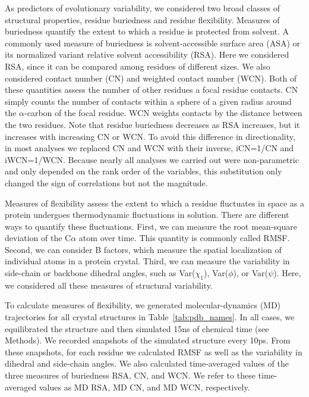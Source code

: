 \documentclass[12pt]{article}
\begin{document}
As predictors of evolutionary variability, we considered two broad classes of structural properties, residue buriedness and residue flexibility. Measures of buriedness quantify the extent to which a residue is protected from solvent. A commonly used measure of buriedness is solvent-accessible surface area (ASA) or its normalized variant relative solvent accessibility (RSA). Here we considered RSA, since it can be compared among residues of different sizes. We also considered contact number (CN) and weighted contact number (WCN). Both of these quantities assess the number of other residues a focal residue contacts. CN simply counts the number of contacts within a sphere of a given radius around the $\alpha$-carbon of the focal residue. WCN weights contacts by the distance between the two residues. Note that residue buriedness decreases as RSA increases, but it increases with increasing CN or WCN. To avoid this difference in directionality, in most analyses we replaced CN and WCN with their inverse, iCN=1/CN and iWCN=1/WCN. Because nearly all analyses we carried out were non-parametric and only depended on the rank order of the variables, this substitution only changed the sign of correlations but not the magnitude.

Measures of flexibility assess the extent to which a residue fluctuates in space as a protein undergoes thermodynamic fluctuations in solution. There are different ways to quantify these fluctuations. First, we can measure the root mean-square deviation of the C$\alpha$ atom over time. This quantity is commonly called RMSF. Second, we can consider B factors, which measure the spatial localization of individual atoms in a protein crystal. Third, we can measure the variability in side-chain or backbone dihedral angles, such as Var($\chi_1$), Var($\phi$), or Var($\psi$). Here, we considered all these measures of structural variability.

To calculate measures of flexibility, we generated molecular-dynamics (MD) trajectories for all crystal structures in Table~\ref{tab:pdb_names}. In all cases, we equilibrated the structure and then simulated 15ns of chemical time (see Methods). We recorded snapshots of the simulated structure every 10ps. From these snapshots, for each residue we calculated RMSF as well as the variability in dihedral and side-chain angles. We also calculated time-averaged values of the three measures of buriedness RSA, CN, and WCN. We refer to these time-averaged values as MD RSA, MD CN, and MD WCN, respectively.
\end{document}
